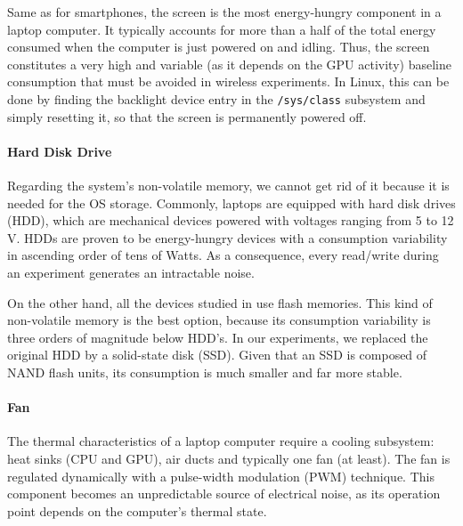 \documentclass[twoside,nohyper]{tufte-book}
\begin{document}
Same as for smartphones\cite[0pt]{Carroll2010}, the screen is the most energy-hungry component in a laptop computer. It typically accounts for more than a half of the total energy consumed when the computer is just powered on and idling. Thus, the screen constitutes a very high and variable (as it depends on the GPU activity) baseline consumption that must be avoided in wireless experiments. In Linux, this can be done by finding the backlight device entry in the \texttt{/sys/class} subsystem and simply resetting it, so that the screen is permanently powered off.

\hypertarget{hard-disk-drive}{%
\paragraph{Hard Disk Drive}\label{hard-disk-drive}}

Regarding the system's non-volatile memory, we cannot get rid of it because it is needed for the OS storage. Commonly, laptops are equipped with hard disk drives (HDD), which are mechanical devices powered with voltages ranging from 5 to 12 V. HDDs are proven to be energy-hungry devices\cite[-1cm]{Hylick2008} with a consumption variability in ascending order of tens of Watts. As a consequence, every read/write during an experiment generates an intractable noise.

On the other hand, all the devices studied in \citet{Serrano2014} use flash memories. This kind of non-volatile memory is the best option, because its consumption variability is three orders of magnitude below HDD's\cite[0pt]{Grupp2009}. In our experiments, we replaced the original HDD by a solid-state disk (SSD). Given that an SSD is composed of NAND flash units, its consumption is much smaller and far more stable.

\hypertarget{fan}{%
\paragraph{Fan}\label{fan}}

The thermal characteristics of a laptop computer require a cooling subsystem: heat sinks (CPU and GPU), air ducts and typically one fan (at least). The fan is regulated dynamically with a pulse-width modulation (PWM) technique. This component becomes an unpredictable source of electrical noise, as its operation point depends on the computer's thermal state.
\end{document}
